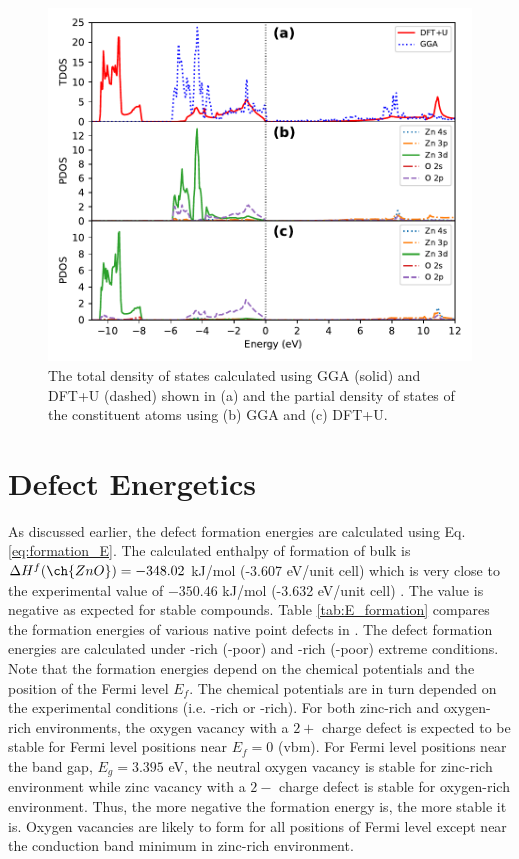 	\begin{figure}[tbh!]
		\centering
		\includegraphics[width=0.7\linewidth]{"images/rnd/dos-pdos_juxtapose"}
		\caption[The total density of states calculated using GGA (solid) and DFT+U (dashed) shown in (a) and the partial density of states of the constituent atoms using (b) GGA and (c) DFT+U]{ The total density of states calculated using GGA (solid) and DFT+U (dashed) shown in (a) and the partial density of states of the constituent atoms using (b) GGA and (c) DFT+U.}
		\label{fig:hubbard_pdos}
	\end{figure}

\clearpage

\section{Defect Energetics}
As discussed earlier, the defect formation energies are calculated using Eq.  \eqref{eq:formation_E}. The calculated enthalpy of formation of bulk  is $\Delta H^f (\ch{ZnO}) = -348.02$ kJ/mol (-3.607 eV/unit cell) which is very close to the experimental value of $-350.46$ kJ/mol (-3.632 eV/unit cell) \citep{Medvedev1989}. The value is negative as expected for stable compounds. Table \ref{tab:E_formation} compares the formation energies of various native point defects in . The defect formation energies are calculated under  -rich (-poor) and -rich (-poor) extreme conditions. Note that the formation energies depend on the chemical potentials and the position of the Fermi level $E_f$. The chemical potentials are in turn depended on the experimental conditions (i.e. -rich or -rich). For both zinc-rich and oxygen-rich environments, the oxygen vacancy with a $2+$ charge defect is expected to be stable for Fermi level positions near $E_f = 0$ (vbm). For Fermi level positions near the band gap, $E_g = 3.395$ eV, the neutral oxygen vacancy is stable for zinc-rich environment while zinc vacancy with a $2-$ charge defect is stable for oxygen-rich environment. Thus, the more negative the formation energy is, the more stable it is. Oxygen vacancies are likely to form for all positions of Fermi level except near the conduction band minimum in zinc-rich environment.   

